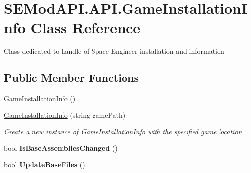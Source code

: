 \hypertarget{class_s_e_mod_a_p_i_1_1_a_p_i_1_1_game_installation_info}{}\section{S\+E\+Mod\+A\+P\+I.\+A\+P\+I.\+Game\+Installation\+Info Class Reference}
\label{class_s_e_mod_a_p_i_1_1_a_p_i_1_1_game_installation_info}


Class dedicated to handle of Space Engineer installation and information  


\subsection*{Public Member Functions}
\begin{DoxyCompactItemize}
\item 
\hyperlink{class_s_e_mod_a_p_i_1_1_a_p_i_1_1_game_installation_info_a2195754adbfb91bbed507b0d0bf69970}{Game\+Installation\+Info} ()
\item 
\hyperlink{class_s_e_mod_a_p_i_1_1_a_p_i_1_1_game_installation_info_a2e1f0ee3eaae13ed1b6a733c44217e6b}{Game\+Installation\+Info} (string game\+Path)
\begin{DoxyCompactList}\small\item\em Create a new instance of \hyperlink{class_s_e_mod_a_p_i_1_1_a_p_i_1_1_game_installation_info}{Game\+Installation\+Info} with the specified game location \end{DoxyCompactList}\item 
\hypertarget{class_s_e_mod_a_p_i_1_1_a_p_i_1_1_game_installation_info_a9103076d69c26decef4c9411df44a07a}{}bool {\bfseries Is\+Base\+Assemblies\+Changed} ()\label{class_s_e_mod_a_p_i_1_1_a_p_i_1_1_game_installation_info_a9103076d69c26decef4c9411df44a07a}

\item 
\hypertarget{class_s_e_mod_a_p_i_1_1_a_p_i_1_1_game_installation_info_a460c8f38eaf983eaf45a9324ecec669c}{}bool {\bfseries Update\+Base\+Files} ()\label{class_s_e_mod_a_p_i_1_1_a_p_i_1_1_game_installation_info_a460c8f38eaf983eaf45a9324ecec669c}

\end{DoxyCompactItemize}
